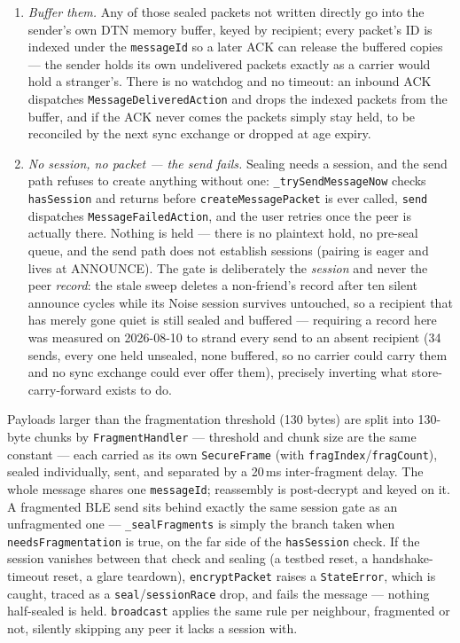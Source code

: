 \documentclass[11pt]{report}
\newcommand{\code}[1]{\texttt{\small #1}}
\begin{document}
\begin{enumerate}
  \item \emph{Buffer them.} Any of those sealed packets not written directly go
    into the sender's own DTN memory buffer, keyed by recipient; every packet's
    ID is indexed under the \code{messageId} so a later ACK can release the
    buffered copies --- the sender holds its own undelivered packets exactly as a
    carrier would hold a stranger's. There is no watchdog and no timeout: an
    inbound ACK dispatches \code{MessageDeliveredAction} and drops the indexed
    packets from the buffer,
    and if the ACK never comes the packets simply stay held, to be reconciled by
    the next sync exchange or dropped at age expiry.
  \item \emph{No session, no packet --- the send fails.} Sealing needs a
    session, and the send path refuses to create anything without one:
    \code{\_trySendMessageNow} checks \code{hasSession} and returns before
    \code{createMessagePacket} is ever called, \code{send} dispatches
    \code{MessageFailedAction}, and the user retries once the peer is actually
    there. Nothing is held --- there is no plaintext hold, no pre-seal queue,
    and the send path does not establish sessions (pairing is eager and lives
    at ANNOUNCE). The gate is deliberately the \emph{session} and never the
    peer \emph{record}: the stale sweep deletes a non-friend's record after ten
    silent announce cycles while its Noise session survives untouched, so a
    recipient that has merely gone quiet is still sealed and buffered ---
    requiring a record here was measured on 2026-08-10 to strand every send to
    an absent recipient (34 sends, every one held unsealed, none buffered, so
    no carrier could carry them and no sync exchange could ever offer them),
    precisely inverting what store-carry-forward exists to do.
\end{enumerate}

Payloads larger than the fragmentation threshold (130 bytes) are split into
130-byte chunks by \code{FragmentHandler} --- threshold and chunk size are the
same constant --- each carried as its own
\code{SecureFrame} (with \code{fragIndex}/\code{fragCount}), sealed
individually, sent, and separated by a 20\,ms inter-fragment delay. The
whole message shares one \code{messageId}; reassembly is post-decrypt and keyed
on it. A fragmented BLE send sits behind exactly the same session gate as an
unfragmented one --- \code{\_sealFragments} is simply the branch taken when
\code{needsFragmentation} is true, on the far side of the \code{hasSession}
check. If the session vanishes between that check and sealing (a testbed reset,
a handshake-timeout reset, a glare teardown), \code{encryptPacket} raises a
\code{StateError}, which is caught, traced as a \code{seal}/\code{sessionRace}
drop, and fails the message --- nothing half-sealed is held.
\code{broadcast} applies the same rule per neighbour, fragmented or not,
silently skipping any peer it lacks a session with.
\end{document}
